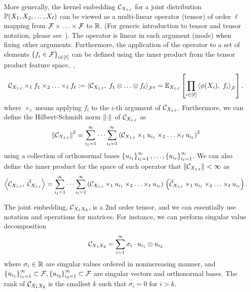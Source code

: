 \documentclass{article}
\begin{document}
More generally, the kernel embedding $\mathcal{C}_{X_{1:\ell}}$ for a joint distribution $\mathbb{P}(X_1,X_2,\ldots,X_{\ell})$ can be viewed as a multi-linear operator (tensor) of order $\ell$ mapping from $\mathcal{F}\times\ldots\times \mathcal{F}$ to $\mathbb{R}$. (For generic introduction to tensor and tensor notation, please see~\cite{KolBad09}). The operator is linear in each argument (mode) when fixing other arguments. Furthermore, the application of the operator to a set of elements $\left\{f_i \in \mathcal{F}\right\}_{i \in [\ell]}$ can be defined using the inner product from the tensor product feature space,~\ie,
\begin{align}
	\mathcal{C}_{X_{1:\ell}} \times_1 f_1 \times_2 \ldots \times_\ell f_\ell := 	\left\langle \mathcal{C}_{X_{1:\ell}},\;f_1\otimes\ldots\otimes f_\ell \right\rangle_{\mathcal{F}^d}=\mathbb{E}_{X_{1:\ell}}\left[\prod_{i \in [\ell]} \left\langle \phi(X_i),~f_i \right\rangle_{\mathcal{F}}\right],
\end{align}
where $\times_i$ means applying $f_i$ to the $i$-th argument of $\mathcal{C}_{X_{1:\ell}}$. Furthermore, we can define the Hilbert-Schmidt norm $\left\|\cdot\right\|_{}$ of $\mathcal{C}_{X_{1:\ell}}$ as
\[
 \left\|\mathcal{C}_{X_{1:\ell}}\right\|_{}^2 = \sum_{i_1 = 1}^\infty \cdots \sum_{i_\ell = 1}^\infty \left(\mathcal{C}_{X_{1:\ell}} \times_1 u_{i_1} \times_2 \ldots \times_\ell u_{i_\ell}\right)^2
\]
using a collection of orthonormal bases $\left\{u_{i_1}\right\}_{i_1=1}^\infty, \ldots, \left\{u_{i_\ell}\right\}_{i_\ell=1}^\infty$. We can also define the inner product for the space of such operator that $\left\|\mathcal{C}_{X_{1:\ell}}\right\|_{}<\infty$ as
\begin{align}
	\left\langle \mathcal{C}_{X_{1:\ell}},~\widetilde{\mathcal{C}}_{X_{1:\ell}} \right\rangle_{}  =  \sum_{i_1 = 1}^\infty \cdots \sum_{i_\ell = 1}^\infty \left(\mathcal{C}_{X_{1:\ell}} \times_1 u_{i_1} \times_2 \ldots \times_\ell u_{i_\ell}\right)\, \left(\widetilde{\mathcal{C}}_{X_{1:\ell}} \times_1 u_{i_1} \times_2 \ldots \times_\ell u_{i_\ell}\right).
\end{align}


The joint embedding, $\mathcal{C}_{X_1 X_2}$, is a 2nd order tensor, and we can essentially use notation and operations for matrices. For instance, we can perform singular value decomposition
\[
    \mathcal{C}_{X_1X_2} = \sum_{i=1}^{\infty} \sigma_i \cdot u_{i_1} \otimes u_{i_2}
\]
where $\sigma_i \in \mathbb{R}$ are singular values ordered in nonincreasing manner, and $\left\{u_{i_1}\right\}_{i_1=1}^{\infty} \subset \mathcal{F}, \left\{u_{i_2}\right\}_{i_2=1}^{\infty} \subset \mathcal{F}$ are singular vectors and orthonormal bases. The rank of $\mathcal{C}_{X_1X_2}$ is the smallest $k$ such that $\sigma_i = 0$ for $i > k$.
\end{document}

